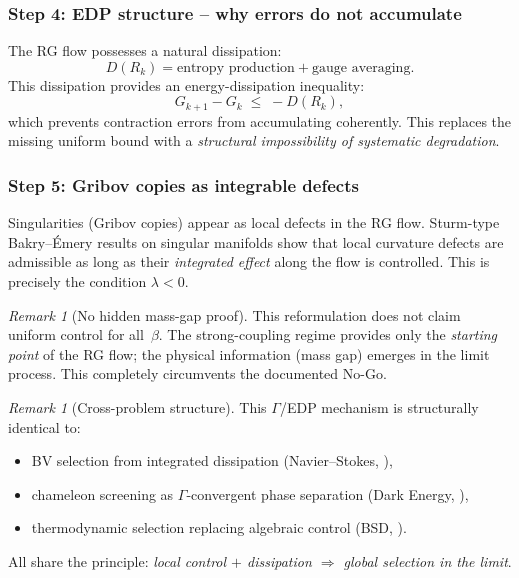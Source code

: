 \documentclass[12pt,a4paper]{article}
\theoremstyle{definition}
\theoremstyle{plain}
\theoremstyle{remark}
\newtheorem{remark}[definition]{Remark}
\begin{document}
\subsubsection*{Step 4: EDP structure -- why errors do not accumulate}

The RG flow possesses a natural dissipation:
\[
  D(R_k) = \text{entropy production} + \text{gauge averaging}.
\]
This dissipation provides an energy-dissipation inequality:
\begin{equation}\label{eq:edp-rg}
  G_{k+1} - G_k \;\leq\; -D(R_k),
\end{equation}
which prevents contraction errors from accumulating coherently. This replaces the missing uniform bound with a \emph{structural impossibility of systematic degradation}.

\subsubsection*{Step 5: Gribov copies as integrable defects}

Singularities (Gribov copies) appear as local defects in the RG flow. Sturm-type Bakry--\'Emery results on singular manifolds \cite{Sturm2025} show that local curvature defects are admissible as long as their \emph{integrated effect} along the flow is controlled. This is precisely the condition $\lambda < 0$.

\begin{remark}[No hidden mass-gap proof]\label{rem:no-hidden-proof}
This reformulation does not claim uniform control for all~$\beta$. The strong-coupling regime provides only the \emph{starting point} of the RG flow; the physical information (mass gap) emerges in the limit process. This completely circumvents the documented No-Go.
\end{remark}

\begin{remark}[Cross-problem structure]\label{rem:cross-edp-ym}
This $\Gamma$/EDP mechanism is structurally identical to:
\begin{itemize}
\item BV selection from integrated dissipation (Navier--Stokes, \cite{FST-NS2026}),
\item chameleon screening as $\Gamma$-convergent phase separation (Dark Energy, \cite{Geiger2026-DE}),
\item thermodynamic selection replacing algebraic control (BSD, \cite{Geiger2026-BSD}).
\end{itemize}
All share the principle: \emph{local control $+$ dissipation $\Rightarrow$ global selection in the limit}.
\end{remark}
\end{document}
